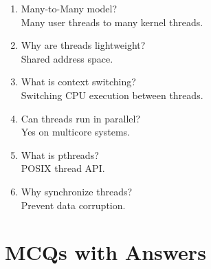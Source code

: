 \begin{enumerate}
\item Many-to-Many model?\\
Many user threads to many kernel threads.

\item Why are threads lightweight?\\
Shared address space.

\item What is context switching?\\
Switching CPU execution between threads.

\item Can threads run in parallel?\\
Yes on multicore systems.

\item What is pthreads?\\
POSIX thread API.

\item Why synchronize threads?\\
Prevent data corruption.
\end{enumerate}

\section{MCQs with Answers}

